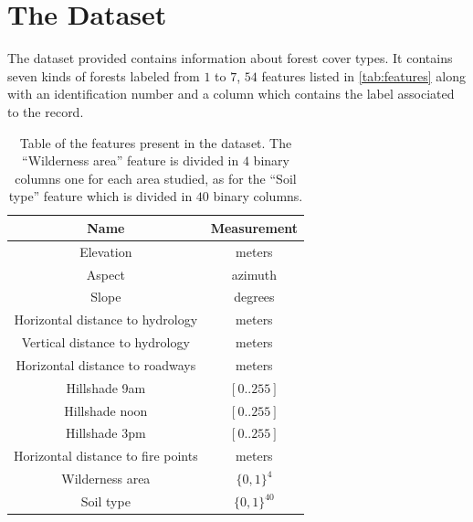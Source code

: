 
\chapter{The Dataset}
The dataset provided contains information about forest cover types. It contains seven kinds of forests labeled from $1$ to $7$, $54$ features listed in \autoref{tab:features} along with an identification number and a column which contains the label associated to the record.
\begin{table}[htpb]
	\centering
\begin{tabular}{|c|c|}
	\hline 
	\textbf{Name} & \textbf{Measurement} \\ 
	\hline 
	Elevation & meters \\ 
	\hline 
	Aspect & azimuth \\ 
	\hline 
	Slope & degrees \\ 
	\hline 
	Horizontal distance to hydrology & meters \\ 
	\hline 
	Vertical distance to hydrology & meters \\ 
	\hline 
	Horizontal distance to roadways & meters \\ 
	\hline 
	Hillshade 9am & $[0..255]$ \\ 
	\hline 
	Hillshade noon & $[0..255]$ \\ 
	\hline 
	Hillshade 3pm & $[0..255]$ \\ 
	\hline 
	Horizontal distance to fire points & meters \\ 
	\hline 
	Wilderness area & $\lbrace0, 1\rbrace^{4}$ \\ 
	\hline 
	Soil type & $\lbrace0, 1\rbrace^{40}$ \\ 
	\hline 
\end{tabular}
\caption{Table of the features present in the dataset. The ``Wilderness area'' feature is divided in $4$ binary columns one for each area studied, as for the ``Soil type'' feature which is divided in $40$ binary columns.}
\label{tab:features}
\end{table}
